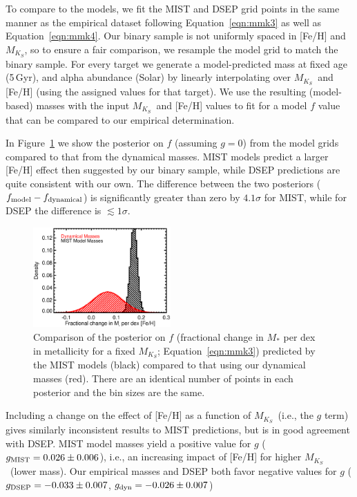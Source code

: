 \documentclass[twocolumn]{aastex62}
\newcommand{\mks}{$M_{K_S}$}
\begin{document}
To compare to the models, we fit the MIST and DSEP grid points in the same manner as the empirical dataset following Equation~\ref{eqn:mmk3} as well as Equation~\ref{eqn:mmk4}. Our binary sample is not uniformly spaced in [Fe/H] and \mks, so to ensure a fair comparison, we resample the model grid to match the binary sample. For every target we generate a model-predicted mass at fixed age (5\,Gyr), and alpha abundance (Solar) by linearly interpolating over \mks\ and [Fe/H] (using the assigned values for that target). We use the resulting (model-based) masses with the input \mks\ and [Fe/H] values to fit for a model $f$ value that can be compared to our empirical determination.

In Figure~\ref{fig:f} we show the posterior on $f$ (assuming $g=0$) from the model grids compared to that from the dynamical masses. MIST models predict a larger [Fe/H] effect then suggested by our binary sample, while DSEP predictions are quite consistent with our own. The difference between the two posteriors ($f_{\rm{model}}-f_{\rm{dynamical}}$) is significantly greater than zero by $4.1\sigma$ for MIST, while for DSEP the difference is $\lesssim1\sigma$. 

\begin{figure}[htp]
\begin{center}
\includegraphics[width=0.47\textwidth]{F_plot.eps}
\caption{Comparison of the posterior on $f$ (fractional change in $M_*$ per dex in metallicity for a fixed \mks; Equation~\ref{eqn:mmk3}) predicted by the MIST models (black) compared to that using our dynamical masses (red). There are an identical number of points in each posterior and the bin sizes are the same. }
\label{fig:f}
\end{center}
\end{figure}

Including a change on the effect of [Fe/H] as a function of \mks\ (i.e., the $g$ term) gives similarly inconsistent results to MIST predictions, but is in good agreement with DSEP. MIST model masses yield a positive value for $g$ ($g_{\rm MIST} = 0.026\pm0.006$), i.e., an increasing impact of [Fe/H] for higher \mks\ (lower mass). Our empirical masses and DSEP both favor negative values for $g$ ($g_{\rm DSEP} = -0.033\pm0.007$, $g_{\rm dyn} = -0.026\pm0.007$)
\end{document}
